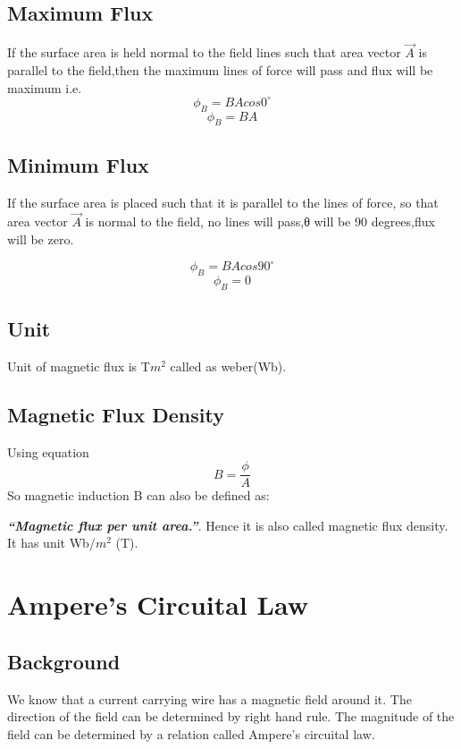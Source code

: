\subsection{Maximum Flux}
If the surface area is held normal to the field lines such that area vector
$\vec{A}$ is parallel to the field,then the maximum lines of force will pass
and flux will be maximum i.e.
\begin{equation}
\phi_{B} =  BA cos0^{\circ} \nonumber
\end{equation}
\begin{equation}
\phi_{B} = BA \nonumber  
\end{equation}

\subsection{Minimum Flux}
 If the surface area is placed such that it is parallel to the
 lines of force, so that area vector $\vec{A}$ is normal to the field,
 no lines will pass,θ will be 90 degrees,flux will be zero.
 
\begin{equation}
\phi_{B} =  BA cos90^{\circ} \nonumber
\end{equation}
\begin{equation}
\phi_{B} = 0 \nonumber  
\end{equation}

\subsection{Unit}
Unit of magnetic flux is T$m^{2}$ called as weber(Wb).

\subsection{Magnetic Flux Density}
Using equation
\begin{equation}
B= \frac{\phi}{A} \nonumber  
\end{equation}
So magnetic induction B can also be defined as:

\textit{\textbf{“Magnetic flux per unit area.”}}.
Hence it is also called magnetic flux density. It has unit Wb/$m^{2}$ (T).

\section{Ampere’s Circuital Law}
\subsection{Background}
 We know that a current carrying wire has a magnetic field around it.
 The direction of the field can be determined by right hand rule.
 The magnitude of the field can be determined by a relation called 
 Ampere’s circuital law.

